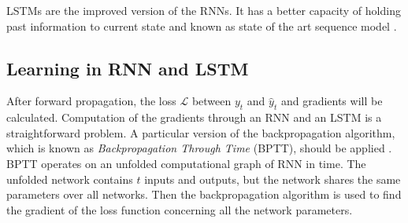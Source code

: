 LSTMs are the improved version of the RNNs. It has a better capacity of holding past information to current state and known as state of the art sequence model \cite{greff2017lstm}.

\subsection{Learning in RNN and LSTM}

After forward propagation, the loss $\mathcal{L}$ between $y_t$ and $\hat{y}_t$ and gradients will be calculated. Computation of the gradients through an RNN and an LSTM is a straightforward problem\cite{goodfellow2016deep}. A particular version of the backpropagation algorithm, which is known as {\it Backpropagation Through Time} (BPTT), should be applied \cite{werbos1990backpropagation}. 
BPTT operates on an unfolded computational graph of RNN in time. The unfolded network contains $t$ inputs and outputs, but the network shares the same parameters over all networks. Then the backpropagation algorithm is used to find the gradient of the loss function concerning all the network parameters.